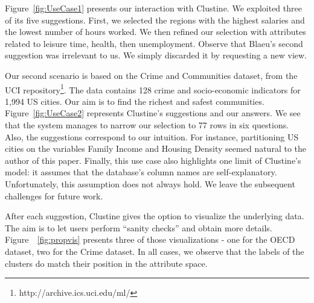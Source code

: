 Figure~\ref{fig:UseCase1} presents our interaction with Clustine. We exploited
three of its five suggestions. First, we selected the regions with the highest
salaries and the lowest number of hours worked.  We then refined our selection
with attributes related to leisure time, health, then unemployment.  Observe
that Blaeu's second suggestion was irrelevant to us. We simply discarded it by
requesting a new view.

Our second scenario is based on the Crime and Communities dataset, from the UCI
repository\footnote{http://archive.ics.uci.edu/ml/}. The data contains 128
crime and socio-economic indicators for 1,994 US cities. Our aim is to find the
richest and safest communities. Figure~\ref{fig:UseCase2} represents Clustine's
suggestions and our answers. We see that the system manages to narrow our
selection to 77 rows in six questions. Also, the suggestions correspond to our
intuition. For instance, partitioning US cities on the variables Family Income
and Housing Density seemed natural to the author of this paper.  Finally, this
use case also highlights one limit of Clustine's model: it assumes that the
database's column names are self-explanatory. Unfortunately, this assumption
does not always hold. We leave the subsequent challenges for future work.

After each suggestion, Clustine gives the option to visualize the underlying
data. The aim is to let users perform ``sanity checks'' and obtain more
details. Figure~~\ref{fig:propvis} presents three of those visualizations - one
for the OECD dataset, two for the Crime dataset. In all cases, we observe that
the labels of the clusters do match their position in the attribute space.
 
